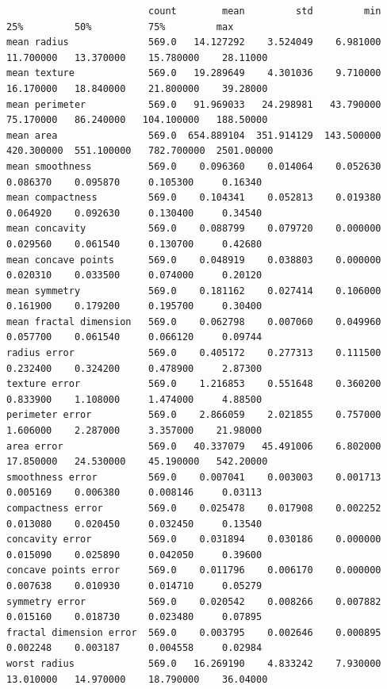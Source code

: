 \documentclass[12pt,a4paper]{article}
\begin{document}
\begin{verbatim}
                         count        mean         std         min         25%         50%          75%         max
mean radius              569.0   14.127292    3.524049    6.981000   11.700000   13.370000    15.780000    28.11000
mean texture             569.0   19.289649    4.301036    9.710000   16.170000   18.840000    21.800000    39.28000
mean perimeter           569.0   91.969033   24.298981   43.790000   75.170000   86.240000   104.100000   188.50000
mean area                569.0  654.889104  351.914129  143.500000  420.300000  551.100000   782.700000  2501.00000
mean smoothness          569.0    0.096360    0.014064    0.052630    0.086370    0.095870     0.105300     0.16340
mean compactness         569.0    0.104341    0.052813    0.019380    0.064920    0.092630     0.130400     0.34540
mean concavity           569.0    0.088799    0.079720    0.000000    0.029560    0.061540     0.130700     0.42680
mean concave points      569.0    0.048919    0.038803    0.000000    0.020310    0.033500     0.074000     0.20120
mean symmetry            569.0    0.181162    0.027414    0.106000    0.161900    0.179200     0.195700     0.30400
mean fractal dimension   569.0    0.062798    0.007060    0.049960    0.057700    0.061540     0.066120     0.09744
radius error             569.0    0.405172    0.277313    0.111500    0.232400    0.324200     0.478900     2.87300
texture error            569.0    1.216853    0.551648    0.360200    0.833900    1.108000     1.474000     4.88500
perimeter error          569.0    2.866059    2.021855    0.757000    1.606000    2.287000     3.357000    21.98000
area error               569.0   40.337079   45.491006    6.802000   17.850000   24.530000    45.190000   542.20000
smoothness error         569.0    0.007041    0.003003    0.001713    0.005169    0.006380     0.008146     0.03113
compactness error        569.0    0.025478    0.017908    0.002252    0.013080    0.020450     0.032450     0.13540
concavity error          569.0    0.031894    0.030186    0.000000    0.015090    0.025890     0.042050     0.39600
concave points error     569.0    0.011796    0.006170    0.000000    0.007638    0.010930     0.014710     0.05279
symmetry error           569.0    0.020542    0.008266    0.007882    0.015160    0.018730     0.023480     0.07895
fractal dimension error  569.0    0.003795    0.002646    0.000895    0.002248    0.003187     0.004558     0.02984
worst radius             569.0   16.269190    4.833242    7.930000   13.010000   14.970000    18.790000    36.04000

\end{verbatim}
\end{document}
